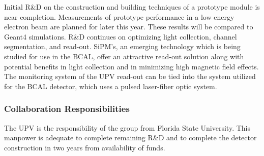 Initial R\&D on the construction and building techniques of a prototype module 
is near completion. Measurements of prototype performance in a low energy 
electron beam are planned for later this year.  These results will be compared 
to Geant4 simulations.   R\&D continues on optimizing light collection, 
channel segmentation, and read-out. SiPM's, an emerging technology which is 
being studied for use in the BCAL, offer an attractive read-out solution 
along with potential benefits in light collection and in minimizing high 
magnetic field effects. The monitoring system of the UPV read-out can be 
tied into the system utilized for the BCAL detector, which uses a pulsed 
laser-fiber optic system.



\subsubsection*{Collaboration Responsibilities}

The UPV is the responsibility of the group from Florida State University.  
This manpower is adequate to complete remaining R\&D and to complete the 
detector construction in two years from availability of funds.

